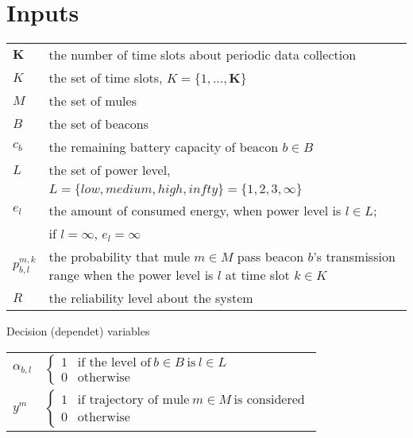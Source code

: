 \documentclass{article}
\begin{document}
\renewcommand{\arraystretch}{1.5}

\thispagestyle{empty}
\setcounter{secnumdepth}{0} %

\section{Inputs}

\vspace{0.2cm}
\renewcommand{\arraystretch}{1.5}
\begin{supertabular}{>{\centering\arraybackslash}m{1.0cm} >{\arraybackslash}m{15cm}}
	
	$\mathbf{K}$ 		& the number of time slots about periodic data collection \\
	$K$ 				& the set of time slots, $K = \{ 1, ..., \mathbf{K}\}$\\
	$M$ 				& the set of mules \\
	$B$ 				& the set of beacons \\
	$c_{b}$ 			& the remaining battery capacity of beacon $b \in B$ \\
	$L$ 				& the set of power level, \\
						& $L = \{ low, medium, high, infty \} = \{ 1, 2, 3, \infty\}$\\
	$e_{l}$				& the amount of consumed energy, when power level is $l \in L$; \\
						& if $l = \infty$, $e_{l}=\infty$ \\ 
	$p^{m, k}_{b, l}$	& the probability that mule $m \in M$ pass beacon $b$'s transmission range when the power level is $l$ at time slot $k \in K$ \\
	$R$				& the reliability level about the system\\

\end{supertabular}

\vspace{0.2cm}
\noindent Decision (dependet) variables

\begin{supertabular}{>{\centering\arraybackslash}m{1.0cm} >{\arraybackslash}m{16.0cm}}
	$\alpha_{b, l}$	& $\left\{
  							\begin{array}{ll}
  								1 & \textrm{if the level of}~b \in B~\textrm{is}~l \in L \\
								0 & \textrm{otherwise}
  							\end{array}
							\right.$ \\
	$y^{m}$				& $\left\{
  							\begin{array}{ll}
  								1 & \textrm{if trajectory of mule}~m \in M~\textrm{is considered}\\
								0 & \textrm{otherwise}
  							\end{array}
							\right.$ \\
\end{supertabular}
\end{document}
